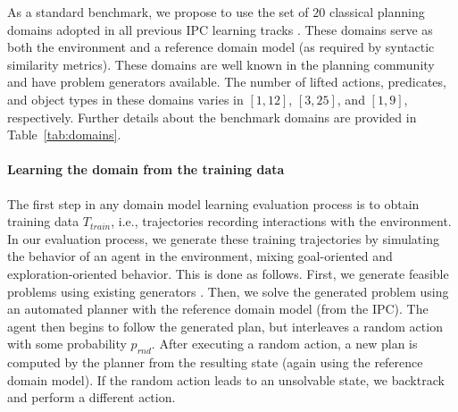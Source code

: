 \documentclass[letterpaper]{article} %
\newcommand{\T}{T}
\newcommand{\Ttrain}{\T_{train}}
\newif\ifaddcomments
\newcommand{\todo}[1]{\ifaddcomments{\textcolor{red}{[TODO: #1]}}\fi}
\newcommand{\roni}[1]{\ifaddcomments{\textcolor{red}{[Roni: #1]}}\fi}
\newcommand{\leo}[1]{\ifaddcomments{\textcolor{pink}{[Leonardo: #1]}}\fi}
\begin{document}





%
As a standard benchmark, we propose to use the set of $20$ classical planning domains adopted in all previous IPC learning tracks \citep{fern2011first, vallati20152014, taitler20242023}. 
These domains serve as both the environment and a reference domain model (as required by syntactic similarity metrics). 
These domains are well known in the planning community and have problem generators available. %
The number of lifted actions, predicates, and object types in these domains varies in 
$[1, 12]$, $[3,25]$, and $[1, 9]$, respectively.
Further details about the benchmark domains are provided in Table~\ref{tab:domains}. 

%
\paragraph{Learning the domain from the training data} 
The first step in any domain model learning evaluation process is to obtain training data $\Ttrain$, i.e., trajectories recording interactions with the environment. 
In our evaluation process, we generate these training trajectories by simulating the behavior of an agent in the environment, mixing goal-oriented and exploration-oriented behavior. 
This is done as follows. 
First, we generate feasible problems using existing generators \citep{seipp-et-al-zenodo2022}. 
Then, we solve the generated problem using an automated planner with the reference domain model (from the IPC). 
The agent then begins to follow the generated plan, but interleaves a random action with some probability $p_{rnd}$.  
After executing a random action, a new plan is computed by the planner from the resulting state (again using the reference domain model). If the random action leads to an unsolvable state, we backtrack and perform a different action. 
\end{document}
